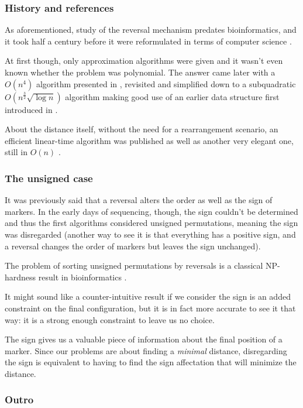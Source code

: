 \documentclass[11pt,final,twoside,nofrench]{thlifl}
\begin{document}
\subsubsection*{History and references}

As aforementioned, study of the reversal mechanism predates bioinformatics, and it took half a century before it were reformulated in terms of computer science \cite{W82} \cite{S89}.

At first though, only approximation algorithms were given and it wasn't even known whether the problem was polynomial.
The answer came later with a $O(n^4)$ algorithm presented in \cite{HP95}, revisited and simplified \cite{KST97} \cite{B01} \cite{TS04} down to a subquadratic $O(n^{\frac{3}{2}}\sqrt{\log n})$ algorithm \cite{TBS07} making good use of an earlier data structure first introduced in \cite{KV05}.

About the distance itself, without the need for a rearrangement scenario, an efficient linear-time algorithm was published \cite{BMY01} as well as another very elegant one, still in $O(n)$ \cite{BMS-04}.

\subsubsection*{The unsigned case}

It was previously said that a reversal alters the order as well as the sign of markers. In the early days of sequencing, though, the sign couldn't be determined and thus the first algorithms considered unsigned permutations, meaning the sign was disregarded (another way to see it is that everything has a positive sign, and a reversal changes the order of markers but leaves the sign unchanged).

The problem of sorting unsigned permutations by reversals is a classical NP-hardness result in bioinformatics \cite{C97}.

It might sound like a counter-intuitive result if we consider the sign is an added constraint on the final configuration, but it is in fact more accurate to see it that way: it is a strong enough constraint to leave us no choice.

The sign gives us a valuable piece of information about the final position of a marker. Since our problems are about finding a \emph{minimal} distance, disregarding the sign is equivalent to having to find the sign affectation that will minimize the distance.

\subsubsection*{Outro}
\end{document}
